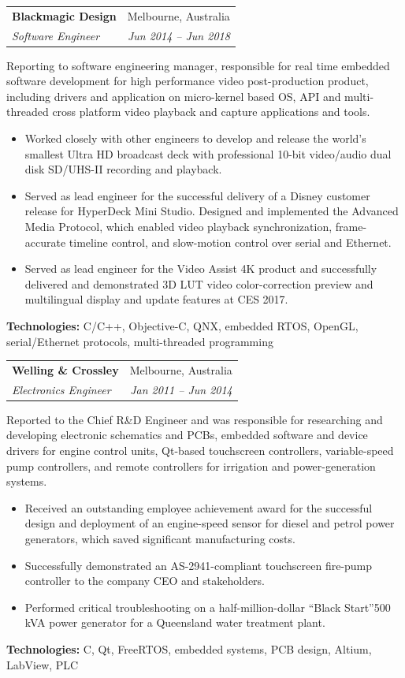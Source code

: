 \documentclass[letterpaper,11pt]{article}
\makeatletter
\newcommand{\resumeItemNoBullet}[4]{
  \vspace{-1pt}
    \begin{tabular*}{0.97\textwidth}{l@{\extracolsep{\fill}}r}
      \textbf{#1} & #2 \\
      \textit{\small#3} & \textit{\small #4} \\
    \end{tabular*}\vspace{-7pt}
}
\newcommand{\resumeSubHeadingListStart}{\begin{itemize}[leftmargin=*]}
\newcommand{\resumeSubHeadingListEnd}{\end{itemize}}
\makeatother
\begin{document}
\resumeItemNoBullet
{Blackmagic Design}{Melbourne, Australia}
{Software Engineer}{Jun 2014 -- Jun 2018}

\vspace{10pt}
{Reporting to software engineering manager, responsible for real time embedded software development for high performance video post-production product, including drivers and application on micro-kernel based OS, API and multi-threaded cross platform video playback and capture applications and tools.}
  \resumeSubHeadingListStart
    \item Worked closely with other engineers to develop and release the world’s smallest Ultra HD broadcast deck with professional 10-bit video/audio dual disk SD/UHS-II recording and playback. 
    \item Served as lead engineer for the successful delivery of a Disney customer release for HyperDeck Mini Studio. Designed and implemented the Advanced Media Protocol, which enabled video playback synchronization, frame-accurate timeline control, and slow-motion control over serial and Ethernet.
    \item Served as lead engineer for the Video Assist 4K product and successfully delivered and demonstrated 3D LUT video color-correction preview and multilingual display and update features at CES 2017.
  \resumeSubHeadingListEnd
  \vspace{2pt}
  {\small \textbf{Technologies:} C/C++, Objective-C, QNX, embedded RTOS, OpenGL, serial/Ethernet protocols, multi-threaded programming}

\resumeItemNoBullet
{Welling \& Crossley}{Melbourne, Australia}
{Electronics Engineer}{Jan 2011 -- Jun 2014}

\vspace{10pt}
{ Reported to the Chief R\&D Engineer and was responsible for researching and developing electronic schematics and PCBs, embedded software and device drivers for engine control units, Qt-based touchscreen controllers, variable-speed pump controllers, and remote controllers for irrigation and power-generation systems. }
  \resumeSubHeadingListStart
    \item Received an outstanding employee achievement award for the successful design and deployment of an engine-speed sensor for diesel and petrol power generators, which saved significant manufacturing costs.
    \item Successfully demonstrated an AS-2941-compliant touchscreen fire-pump controller to the company CEO and stakeholders.
    \item Performed critical troubleshooting on a half-million-dollar \textquotedblleft Black Start\textquotedblright 500 kVA power generator for a Queensland water treatment plant.
  \resumeSubHeadingListEnd
  \vspace{2pt}
  {\small \textbf{Technologies:} C, Qt, FreeRTOS, embedded systems, PCB design, Altium, LabView, PLC}
\end{document}
